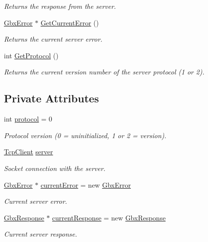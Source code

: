\begin{DoxyCompactItemize}
\begin{DoxyCompactList}\small\item\em Returns the response from the server. \end{DoxyCompactList}\item 
\hyperlink{structGbxError}{Gbx\-Error} $\ast$ \hyperlink{classGbxRemote_a5467b5400129cd13239f88576aaaa2b4}{Get\-Current\-Error} ()
\begin{DoxyCompactList}\small\item\em Returns the current server error. \end{DoxyCompactList}\item 
int \hyperlink{classGbxRemote_ae6e15060920a31482fd14045cfd42803}{Get\-Protocol} ()
\begin{DoxyCompactList}\small\item\em Returns the current version number of the server protocol (1 or 2). \end{DoxyCompactList}\end{DoxyCompactItemize}
\subsection*{Private Attributes}
\begin{DoxyCompactItemize}
\item 
int \hyperlink{classGbxRemote_a5ee5c7087085cb6cb2e7bc6135ff0646}{protocol} = 0
\begin{DoxyCompactList}\small\item\em Protocol version (0 = uninitialized, 1 or 2 = version). \end{DoxyCompactList}\item 
\hyperlink{classTcpClient}{Tcp\-Client} \hyperlink{classGbxRemote_a0b0b212b945da4266fb645affdac81cb}{server}
\begin{DoxyCompactList}\small\item\em Socket connection with the server. \end{DoxyCompactList}\item 
\hyperlink{structGbxError}{Gbx\-Error} $\ast$ \hyperlink{classGbxRemote_ae5d44c3729140c1eba5e850cb5e5e7bd}{current\-Error} = new \hyperlink{structGbxError}{Gbx\-Error}
\begin{DoxyCompactList}\small\item\em Current server error. \end{DoxyCompactList}\item 
\hyperlink{classGbxResponse}{Gbx\-Response} $\ast$ \hyperlink{classGbxRemote_a3a3a0af1a692a801a33baa292b877dc2}{current\-Response} = new \hyperlink{classGbxResponse}{Gbx\-Response}
\begin{DoxyCompactList}\small\item\em Current server response. \end{DoxyCompactList}\end{DoxyCompactItemize}


